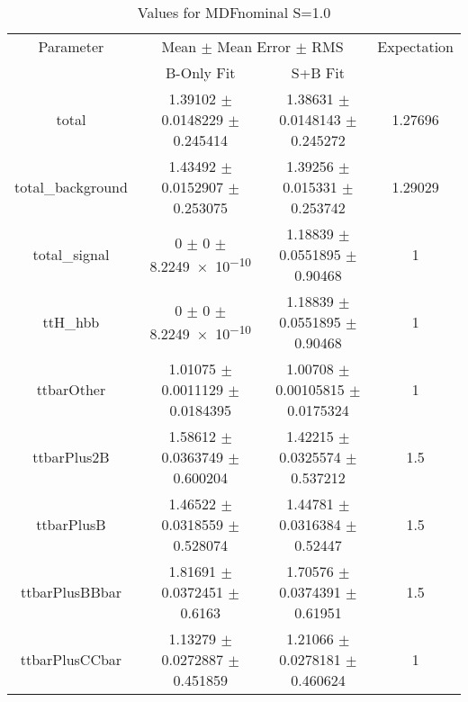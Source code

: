 \begin{table}
\centering
\caption{Values for MDFnominal S=1.0}
\begin{tabular}{cccc}
\toprule
Parameter & \multicolumn{2}{c}{Mean $\pm$ Mean Error $\pm$ RMS} & Expectation\\
 & B-Only Fit & S+B Fit & \\
\midrule
total & \num{1.39102} $\pm$ \num{0.0148229} $\pm$ \num{0.245414} & \num{1.38631} $\pm$ \num{0.0148143} $\pm$ \num{0.245272} & \num{1.27696}\\
total\_background & \num{1.43492} $\pm$ \num{0.0152907} $\pm$ \num{0.253075} & \num{1.39256} $\pm$ \num{0.015331} $\pm$ \num{0.253742} & \num{1.29029}\\
total\_signal & \num{0} $\pm$ \num{0} $\pm$ \num{8.2249e-10} & \num{1.18839} $\pm$ \num{0.0551895} $\pm$ \num{0.90468} & \num{1}\\
ttH\_hbb & \num{0} $\pm$ \num{0} $\pm$ \num{8.2249e-10} & \num{1.18839} $\pm$ \num{0.0551895} $\pm$ \num{0.90468} & \num{1}\\
ttbarOther & \num{1.01075} $\pm$ \num{0.0011129} $\pm$ \num{0.0184395} & \num{1.00708} $\pm$ \num{0.00105815} $\pm$ \num{0.0175324} & \num{1}\\
ttbarPlus2B & \num{1.58612} $\pm$ \num{0.0363749} $\pm$ \num{0.600204} & \num{1.42215} $\pm$ \num{0.0325574} $\pm$ \num{0.537212} & \num{1.5}\\
ttbarPlusB & \num{1.46522} $\pm$ \num{0.0318559} $\pm$ \num{0.528074} & \num{1.44781} $\pm$ \num{0.0316384} $\pm$ \num{0.52447} & \num{1.5}\\
ttbarPlusBBbar & \num{1.81691} $\pm$ \num{0.0372451} $\pm$ \num{0.6163} & \num{1.70576} $\pm$ \num{0.0374391} $\pm$ \num{0.61951} & \num{1.5}\\
ttbarPlusCCbar & \num{1.13279} $\pm$ \num{0.0272887} $\pm$ \num{0.451859} & \num{1.21066} $\pm$ \num{0.0278181} $\pm$ \num{0.460624} & \num{1}\\
\bottomrule
\end{tabular}
\end{table}